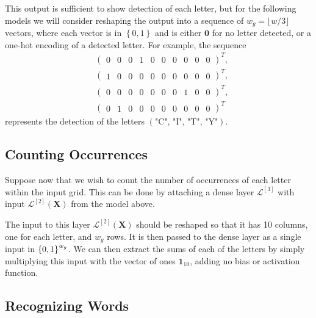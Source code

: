 \documentclass{somasmsc}
\begin{document}
This output is sufficient to show detection of each letter, but for the following models we will consider reshaping the output into a sequence of $w_g = \lfloor w/3 \rfloor$ vectors, where each vector is in $\left\{0,1\right\}$ and is either $\mathbf{0}$ for no letter detected, or a one-hot encoding of a detected letter. For example, the sequence
\begin{align*}
    &\begin{pmatrix}
        0 & 0 & 0 & 1 & 0 & 0 & 0 & 0 & 0 & 0
    \end{pmatrix}^T, \\
    &\begin{pmatrix}
        1 & 0 & 0 & 0 & 0 & 0 & 0 & 0 & 0 & 0
    \end{pmatrix}^T, \\
    &\begin{pmatrix}
        0 & 0 & 0 & 0 & 0 & 0 & 0 & 1 & 0 & 0
    \end{pmatrix}^T, \\
    &\begin{pmatrix}
        0 & 1 & 0 & 0 & 0 & 0 & 0 & 0 & 0 & 0
    \end{pmatrix}^T
\end{align*}
represents the detection of the letters $\left(\text{"C", "I", "T", "Y"}\right)$.

\subsection{Counting Occurrences}\label{letters:count}

Suppose now that we wish to count the number of occurrences of each letter within the input grid. This can be done by attaching a dense layer $\mathcal{L}^{\left[3\right]}$ with input $\mathcal{L}^{\left[2\right]}\left(\mathbf{X}\right)$ from the model above.

The input to this layer $\mathcal{L}^{\left[2\right]}\left(\mathbf{X}\right)$ should be reshaped so that it has 10 columns, one for each letter, and $w_g$ rows. It is then passed to the dense layer as a single input in $\left\{0,1\right\}^{w_g \time 10}$. We can then extract the sums of each of the letters by simply multiplying this input with the vector of ones $\mathbf{1}_{10}$, adding no bias or activation function.

\subsection{Recognizing Words}\label{letters:words}
\end{document}
